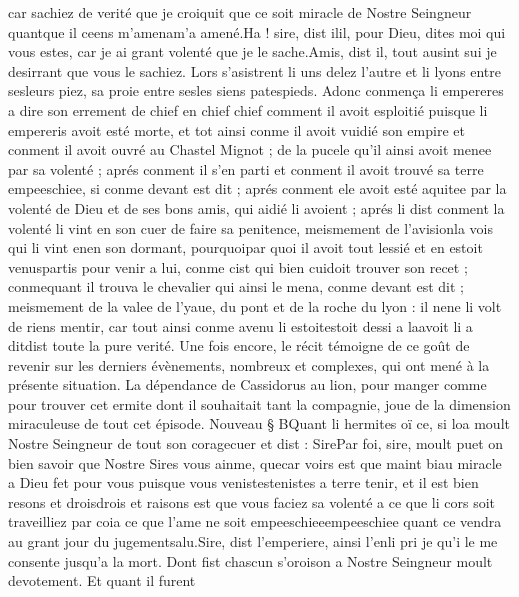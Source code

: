 \documentclass{article}
\begin{document}
\begin{pages}
      car sachiez de verité que je croiquit 
      que ce soit miracle de Nostre Seingneur quantque il ceens 
      m’amenam'a amené.Ha ! sire, dist ilil, pour Dieu, 
      dites moi qui vous estes, car je ai grant volenté que je le sache.Amis, dist il, tout ausint sui je desirrant que vous le sachiez.
   Lors s’asistrent li uns delez l’autre et li lyons entre 
   sesleurs piez, sa proie entre 
   sesles siens patespieds. 
   Adonc conmença li empereres a dire 
   son errement de chief en chief
      chief comment il avoit esploitié 
   puisque li empereris avoit esté morte, et tot ainsi conme il avoit vuidié son empire 
   et conment il avoit ouvré au Chastel Mignot ; 
   de la pucele qu'il ainsi avoit menee par sa volenté ; 
   aprés conment il s’en parti et conment il avoit trouvé sa terre empeeschiee, 
   si conme devant est dit ; aprés conment ele avoit esté aquitee par la volenté de Dieu 
   et de ses bons amis, qui aidié li avoient ;
   aprés li dist conment la volenté li vint en son cuer de faire sa penitence, 
      meismement de 
      l’avisionla vois qui li vint 
      enen son dormant, 
      pourquoipar quoi il avoit tout lessié et en estoit 
      venuspartis pour venir a lui, 
   conme cist qui bien cuidoit trouver son recet ; 
      conmequant il trouva 
      le chevalier qui ainsi le mena, conme devant est dit ; 
      meismement de la valee de l’yaue, du pont et de 
      la roche du lyon : 
   il nene li volt de riens 
   mentir, car tout ainsi conme avenu li 
   estoitestoit dessi a laavoit li 
   a ditdist toute la pure verité. 
   Une fois encore, le récit témoigne de ce goût de revenir sur les derniers évènements, nombreux et 
   complexes, qui ont mené à la présente situation. La dépendance de Cassidorus au lion, pour manger comme pour trouver cet 
   ermite dont il souhaitait tant la compagnie, joue de la dimension miraculeuse de tout cet épisode.
   Nouveau § BQuant li hermites oï ce, 
   si loa moult Nostre Seingneur de tout son coragecuer et dist :
   SirePar foi, sire, 
      moult puet on bien savoir que Nostre Sires vous ainme, 
      quecar voirs est que maint biau miracle a Dieu fet pour vous 
      puisque vous venistestenistes a terre 
      tenir, 
      et il est bien resons et droisdrois et raisons est 
      que vous faciez sa volenté a ce que li cors soit traveilliez 
      par coia ce que l’ame 
      ne soit empeeschieeempeeschiee quant ce vendra au grant jour du 
      jugementsalu.Sire, dist l’emperiere, ainsi 
      l’enli pri je qu’i le me consente jusqu’a la mort.
   Dont fist chascun s’oroison a Nostre Seingneur moult devotement. Et quant il furent 

\end{pages}
\end{document}

